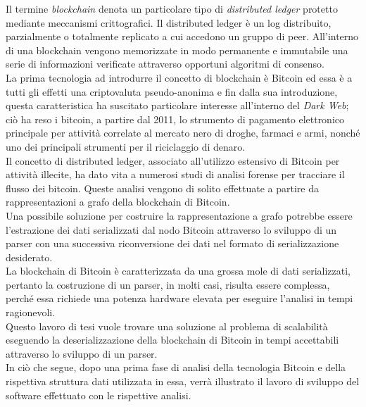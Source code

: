 \documentclass[11pt, a4paper, titlepage]{toptesi}
\theoremstyle{definition}
\begin{document}
\sommario
Il termine \emph{blockchain} denota un particolare tipo di \emph{distributed ledger} protetto mediante meccanismi crittografici.
Il distributed ledger è un log distribuito, parzialmente o totalmente replicato a cui accedono un gruppo di peer.
All’interno di una blockchain vengono memorizzate in modo permanente e immutabile una serie di informazioni verificate attraverso opportuni algoritmi di consenso.\\
La prima tecnologia ad introdurre il concetto di blockchain è Bitcoin ed essa è a tutti gli effetti una criptovaluta pseudo-anonima e fin dalla sua introduzione, questa  caratteristica  ha suscitato particolare interesse all’interno del \emph{Dark Web}; ciò ha reso i bitcoin, a partire dal 2011, lo strumento di pagamento elettronico principale per attività correlate al mercato nero di droghe, farmaci e armi, nonché uno dei principali strumenti per il riciclaggio di denaro.\\
Il concetto di distributed ledger, associato all’utilizzo estensivo di Bitcoin per attività illecite, ha dato vita a numerosi studi di analisi forense per tracciare il flusso dei bitcoin. Queste analisi vengono di solito effettuate a partire da rappresentazioni a grafo della blockchain di Bitcoin.\\
Una possibile soluzione per costruire la rappresentazione a grafo potrebbe essere l'estrazione dei dati serializzati dal nodo Bitcoin attraverso lo sviluppo di un parser con una successiva riconversione dei dati nel formato di serializzazione desiderato.\\
La blockchain di Bitcoin è caratterizzata da una grossa mole di dati serializzati, pertanto la costruzione di un parser, in molti casi, risulta essere complessa, perché essa richiede una potenza hardware elevata per eseguire l'analisi in tempi ragionevoli.\\
Questo lavoro di tesi vuole trovare una soluzione al problema di scalabilità eseguendo la deserializzazione della blockchain di Bitcoin in tempi accettabili attraverso lo sviluppo di un parser.\\
In ciò che segue, dopo una prima fase di analisi della tecnologia Bitcoin e della rispettiva struttura dati utilizzata in essa, verrà illustrato il lavoro di sviluppo del software effettuato con le rispettive analisi.



\tableofcontents
\end{document}
